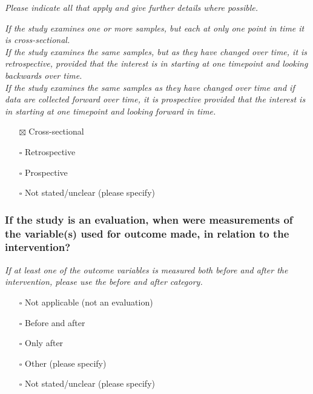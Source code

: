 \documentclass[
  doc, a4paper]{apa7}
\providecommand{\tightlist}{%
  \setlength{\itemsep}{0pt}\setlength{\parskip}{0pt}}
\begin{document}
\emph{Please indicate all that apply and give further details where possible.}

\emph{If the study examines one or more samples, but each at only one point in time it is cross-sectional.}\\
\emph{If the study examines the same samples, but as they have changed over time, it is retrospective, provided that the interest is in starting at one timepoint and looking backwards over time.}\\
\emph{If the study examines the same samples as they have changed over time and if data are collected forward over time, it is prospective provided that the interest is in starting at one timepoint and looking forward in time.}

\begin{itemize}
\tightlist
\item[$\boxtimes$]
  Cross-sectional\\
\item[$\square$]
  Retrospective\\
\item[$\square$]
  Prospective\\
\item[$\square$]
  Not stated/unclear (please specify)
\end{itemize}

\subsubsection{If the study is an evaluation, when were measurements of the variable(s) used for outcome made, in relation to the intervention?}\label{if-the-study-is-an-evaluation-when-were-measurements-of-the-variables-used-for-outcome-made-in-relation-to-the-intervention}

\emph{If at least one of the outcome variables is measured both before and after the intervention, please use the before and after category.}

\begin{itemize}
\tightlist
\item[$\square$]
  Not applicable (not an evaluation)\\
\item[$\square$]
  Before and after\\
\item[$\square$]
  Only after\\
\item[$\square$]
  Other (please specify)\\
\item[$\square$]
  Not stated/unclear (please specify)
\end{itemize}
\end{document}
